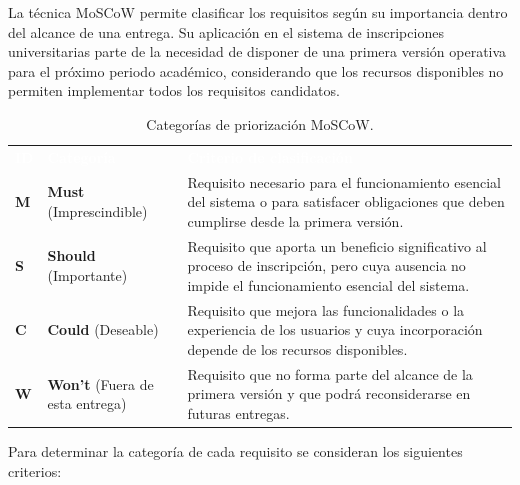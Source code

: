 \documentclass[12pt,a4paper]{article}
\newcommand{\cabecera}[1]{
    \textcolor{white}{\textbf{#1}}
}
\begin{document}
La técnica MoSCoW permite clasificar los requisitos según
su importancia dentro del alcance de una entrega. Su
aplicación en el sistema de inscripciones universitarias
parte de la necesidad de disponer de una primera versión
operativa para el próximo periodo académico, considerando
que los recursos disponibles no permiten implementar
todos los requisitos candidatos.

\begin{table}[htbp]
    \centering
    \small

    \begin{tabularx}{\textwidth}{C{0.8cm} L{3cm} Y}

        \cabecera{ID} &
        \cabecera{Categoría} &
        \cabecera{Criterio de clasificación} \\

        \textbf{M} &
        \textbf{Must} (Imprescindible) &
        Requisito necesario para el funcionamiento
        esencial del sistema o para satisfacer
        obligaciones que deben cumplirse desde la
        primera versión. \\

        \textbf{S} &
        \textbf{Should} (Importante) &
        Requisito que aporta un beneficio significativo
        al proceso de inscripción, pero cuya ausencia
        no impide el funcionamiento esencial del sistema. \\

        \textbf{C} &
        \textbf{Could} (Deseable) &
        Requisito que mejora las funcionalidades o la
        experiencia de los usuarios y cuya incorporación
        depende de los recursos disponibles. \\

        \textbf{W} &
        \textbf{Won't} (Fuera de esta entrega) &
        Requisito que no forma parte del alcance de
        la primera versión y que podrá reconsiderarse
        en futuras entregas. \\

        \bottomrule

    \end{tabularx}

    \caption{Categorías de priorización MoSCoW.}
    \label{tab:categorias-moscow}

\end{table}

Para determinar la categoría de cada requisito se
consideran los siguientes criterios:
\end{document}
